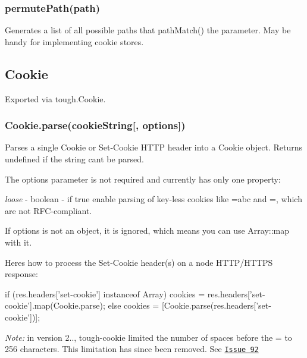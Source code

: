 \subsubsection*{{\ttfamily permute\+Path(path)}}

Generates a list of all possible paths that {\ttfamily path\+Match()} the parameter. May be handy for implementing cookie stores.

\subsection*{Cookie}

Exported via {\ttfamily tough.\+Cookie}.

\subsubsection*{{\ttfamily Cookie.\+parse(cookie\+String\mbox{[}, options\mbox{]})}}

Parses a single Cookie or Set-\/\+Cookie H\+T\+TP header into a {\ttfamily Cookie} object. Returns {\ttfamily undefined} if the string can\textquotesingle{}t be parsed.

The options parameter is not required and currently has only one property\+:


\begin{DoxyItemize}
\item {\itshape loose} -\/ boolean -\/ if {\ttfamily true} enable parsing of key-\/less cookies like {\ttfamily =abc} and {\ttfamily =}, which are not R\+F\+C-\/compliant.
\end{DoxyItemize}

If options is not an object, it is ignored, which means you can use {\ttfamily Array\+::map} with it.

Here\textquotesingle{}s how to process the Set-\/\+Cookie header(s) on a node H\+T\+T\+P/\+H\+T\+T\+PS response\+:


\begin{DoxyCode}
if (res.headers['set-cookie'] instanceof Array)
  cookies = res.headers['set-cookie'].map(Cookie.parse);
else
  cookies = [Cookie.parse(res.headers['set-cookie'])];
\end{DoxyCode}


{\itshape Note\+:} in version 2.., tough-\/cookie limited the number of spaces before the {\ttfamily =} to 256 characters. This limitation has since been removed. See \href{https://github.com/salesforce/tough-cookie/issues/92}{\tt Issue 92}

